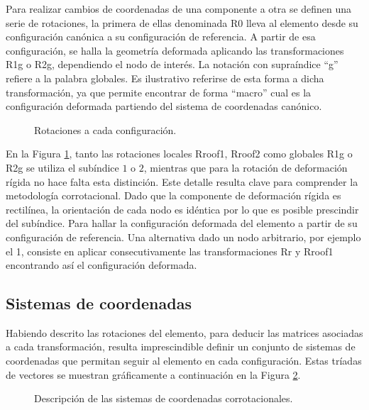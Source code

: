 Para realizar cambios  de coordenadas de una componente a otra se definen una serie de rotaciones, la primera de ellas denominada \gls{R0} lleva al elemento desde su configuración canónica a su configuración de referencia. A partir de esa configuración, se halla la geometría deformada aplicando las transformaciones \gls{R1g} o \gls{R2g}, dependiendo el nodo de interés. La notación con supraíndice ``g'' refiere a la palabra globales. Es ilustrativo referirse de esta forma a dicha transformación, ya que permite encontrar de forma ``macro'' cual es la configuración deformada partiendo del sistema de coordenadas canónico.

\begin{figure}[htbp]
	\centering
	\def\svgwidth{100mm}
	
	\caption{Rotaciones a cada configuración.}
	\label{fig:PRE:IlusCorrotRot}
\end{figure}

En la Figura \ref{fig:PRE:IlusCorrotRot}, tanto las rotaciones locales \gls{Rroof1}, \gls{Rroof2} como globales  \gls{R1g} o \gls{R2g} se utiliza el subíndice $1$ o $2$, mientras que para la rotación de deformación rígida no hace falta esta distinción. Este detalle resulta clave para comprender la metodología corrotacional. Dado que la componente de deformación rígida es rectilínea, la orientación de cada nodo es idéntica por lo que es posible prescindir del subíndice. Para hallar la configuración deformada del elemento a partir de su configuración de referencia. Una alternativa dado un nodo arbitrario, por ejemplo el 1, consiste en aplicar consecutivamente las transformaciones \gls{Rr} y \gls{Rroof1} encontrando así el configuración deformada.

\subsection{Sistemas de coordenadas}
Habiendo descrito las rotaciones del elemento, para deducir las matrices asociadas a cada transformación, resulta imprescindible definir un conjunto de sistemas de coordenadas que permitan seguir al elemento en cada configuración. Estas tríadas de vectores se muestran gráficamente a continuación en la Figura \ref{fig:PRE:IlusCorrot}.

\begin{figure}[htbp]
	\centering
	\def\svgwidth{100mm}
	
	\caption{Descripción de las sistemas de coordenadas corrotacionales.}
	\label{fig:PRE:IlusCorrot}
\end{figure}


